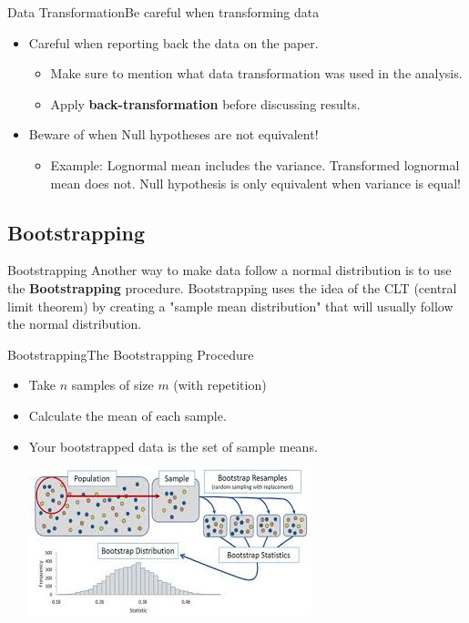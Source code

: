 \begin{frame}{Data Transformation}{Be careful when transforming data}
  \begin{itemize}
    \item Careful when reporting back the data on the paper.
    \begin{itemize}
      \item Make sure to mention what data transformation was used in the analysis.
      \item Apply {\bf back-transformation} before discussing results.
    \end{itemize}\bigskip

    \item Beware of when Null hypotheses are not equivalent!
    \begin{itemize}
      \item Example: Lognormal mean includes the variance. Transformed lognormal mean does not. Null hypothesis is only equivalent when variance is equal!
    \end{itemize}
  \end{itemize}
\end{frame}


\subsection{Bootstrapping}

\begin{frame}{Bootstrapping}{}
  Another way to make data follow a normal distribution is to use
  the {\bf Bootstrapping} procedure. Bootstrapping uses the idea of the CLT
  (central limit theorem) by creating a "sample mean distribution" that
  will usually follow the normal distribution.
\end{frame}

\begin{frame}{Bootstrapping}{The Bootstrapping Procedure}
  \begin{itemize}
    \item Take $n$ samples of size $m$ (with repetition)
    \item Calculate the mean of each sample.
    \item Your bootstrapped data is the set of sample means.

    \begin{center}
      \includegraphics[width=.8\textwidth]{../img/bootstrap_lowres}
    \end{center}
  \end{itemize}

\end{frame}

